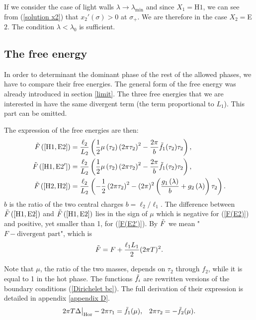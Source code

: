 If we consider the case of light walls $\lambda\rightarrow\lambda_{\text{min}}$ and since $X_1=$H$1$, we can see from (\ref{solution x2}) that $x_2'(\sigma)>0$ at $\sigma_+$. We are therefore in the case $X_2=$E$2$. The condition $\lambda<\lambda_0$ is sufficient.

\subsection{The free energy}

In order to determinant the dominant phase of the rest of the allowed phases, we have to compare their free energies. The general form of the free energy was already introduced in section \ref{limit}. The three free energies that we are interested in have the same divergent term (the term proportional to $L_1$). This part can be omitted.

The expression of the free energies are then:
\begin{subequations}\label{free E}
    \begin{align}
        \Tilde{F}\left(\left[\text{H}1,\text{E}2\right]\right) &=\frac{\ell_2}{L_2}\left( \frac{1}{2}\mu\left(\tau_2\right)\left(2\pi\tau_2\right)^2 - \frac{2\pi}{{b}}\Tilde{f}_1(\tau_2)\tau_2\right), \label{F(E2)}\\
        \Tilde{F}\left(\left[\text{H}1,\text{E}2'\right]\right) &=\frac{\ell_2}{L_2}\left( \frac{1}{2}\mu\left(\tau_2\right)\left(2\pi\tau_2\right)^2 - \frac{2\pi}{{b}}\Tilde{f}_1(\tau_2)\tau_2\right), \label{F(E2')}\\
        \Tilde{F}\left(\left[\text{H}2,\text{H}2\right]\right) &=\frac{\ell_2}{L_2}\left( -\frac{1}{2}\left(2\pi\tau_2\right)^2 - (2\pi)^2\left(\frac{g_1\left(\lambda\right)}{b}+g_2\left(\lambda\right)\right)\tau_2\right). \label{F(H2)}
    \end{align}
\end{subequations}
$b$ is the ratio of the two central charges $b=\ell_2/\ell_1$. The difference between $\Tilde{F}\left(\left[\text{H}1,\text{E}2\right]\right)$ and $\Tilde{F}\left(\left[\text{H}1,\text{E}2\right]\right)$ lies in the sign of $\mu$ which is negative for (\ref{F(E2)}) and positive, yet smaller than 1, for (\ref{F(E2')}). By $\Tilde{F}$ we mean "$F-\text{divergent part}$", which is 
\begin{equation}
    \Tilde{F} = F + \frac{\ell_1L_1}{2}(2\pi T)^2.
\end{equation}

Note that $\mu$, the ratio of the two masses, depends on $\tau_2$ through $f_2$, while it is equal to 1 in the hot phase. The functions $\Tilde{f}_i$ are rewritten versions of the boundary conditions (\ref{Dirichelet bc}). The full derivation of their expression is detailed in appendix \ref{appendix D}.
\begin{align}\label{f2 constrain}
     2\pi T\Delta\big|_\text{Hor} -2\pi\tau_1= \Tilde{f}_1(\mu), && 2\pi\tau_2= -\Tilde{f}_2(\mu).
\end{align}

